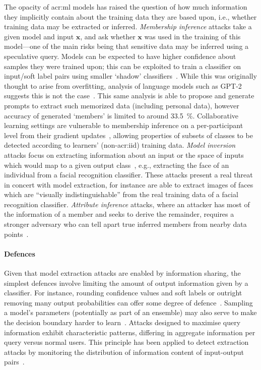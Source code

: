The opacity of \gls{acr:ml} models has raised the question of how much information they implicitly contain about the training data they are based upon, i.e., whether training data may be extracted or inferred.
\emph{Membership inference} attacks take a given model and input $\mathbf{x}$, and ask whether $\mathbf{x}$ was used in the training of this model---one of the main risks being that sensitive data may be inferred using a speculative query.
Models can be expected to have higher confidence about samples they were trained upon; this can be exploited to train a classifier on input/soft label pairs using smaller `shadow' classifiers~\parencite{DBLP:conf/sp/ShokriSSS17}.
While this was originally thought to arise from overfitting, analysis of language models such as GPT-2 suggests this is not the case~\parencite{DBLP:journals/corr/abs-2012-07805}.
This same analysis is able to propose and generate prompts to extract such memorized data (including personal data), however accuracy of generated `members' is limited to around \qty{33.5}{\percent}.
Collaborative learning settings are vulnerable to membership inference on a per-participant level from their gradient updates~\parencite{DBLP:conf/sp/MelisSCS19}, allowing properties of subsets of classes to be detected according to learners' (non-\gls{acr:iid}) training data.
\emph{Model inversion} attacks focus on extracting information about an input or the space of inputs which would map to a given output class~\parencite{DBLP:conf/ccs/FredriksonJR15}, e.g., extracting the face of an individual from a facial recognition classifier.
These attacks present a real threat in concert with model extraction, for instance \textcite{DBLP:conf/uss/TramerZJRR16} are able to extract images of faces which are ``visually indistinguishable'' from the real training data of a facial recognition classifier.
\emph{Attribute inference} attacks, where an attacker has most of the information of a member and seeks to derive the remainder, requires a stronger adversary who can tell apart true inferred members from nearby data points~\parencite{DBLP:journals/corr/abs-2103-07101}.


\paragraph{Defences}
Given that model extraction attacks are enabled by information sharing, the simplest defences involve limiting the amount of output information given by a classifier.
For instance, rounding confidence values and soft labels or outright removing many output probabilities can offer some degree of defence~\parencite{DBLP:conf/uss/TramerZJRR16,DBLP:conf/uss/ChandrasekaranC20}.
Sampling a model's parameters (potentially as part of an ensemble) may also serve to make the decision boundary harder to learn~\parencite{DBLP:conf/uss/ChandrasekaranC20}.
Attacks designed to maximise query information exhibit characteristic patterns, differing in aggregate information per query versus normal users.
This principle has been applied to detect extraction attacks by monitoring the distribution of information content of input-output pairs~\parencite{DBLP:conf/eurosp/JuutiSMA19,DBLP:conf/acsac/KesarwaniMAM18}.

